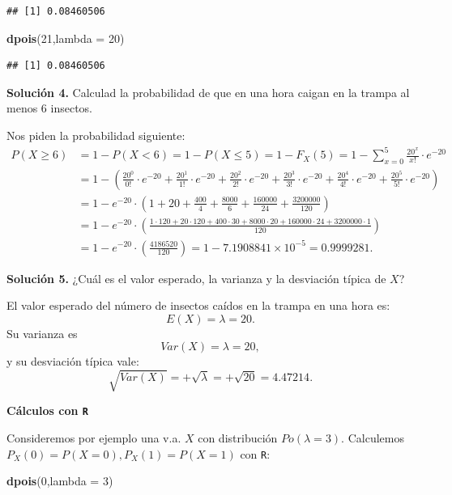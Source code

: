 \documentclass[]{book}
\newenvironment{Shaded}{\begin{snugshade}}{\end{snugshade}}
\newcommand{\DataTypeTok}[1]{\textcolor[rgb]{0.13,0.29,0.53}{#1}}
\newcommand{\DecValTok}[1]{\textcolor[rgb]{0.00,0.00,0.81}{#1}}
\newcommand{\KeywordTok}[1]{\textcolor[rgb]{0.13,0.29,0.53}{\textbf{#1}}}
\newcommand{\NormalTok}[1]{#1}
\begin{document}
\begin{verbatim}
## [1] 0.08460506
\end{verbatim}

\begin{Shaded}
\begin{Highlighting}[]
\KeywordTok{dpois}\NormalTok{(}\DecValTok{21}\NormalTok{,}\DataTypeTok{lambda =} \DecValTok{20}\NormalTok{)}
\end{Highlighting}
\end{Shaded}

\begin{verbatim}
## [1] 0.08460506
\end{verbatim}

\textbf{Solución 4.} Calculad la probabilidad de que en una hora caigan en la trampa al menos 6 insectos.

Nos piden la probabilidad siguiente:
\[
\begin{array}{rl}
 P(X\geq 6)&=1- P(X<6)=1-P(X\leq 5)=1-F_X(5)=1-\displaystyle\sum_{x=0}^{5} \frac{20^{x}}{x!}\cdot e^{-20}\\
 &=
 1-\left(\frac{20^{0}}{0!}\cdot e^{-20}+\frac{20^{1}}{1!}\cdot e^{-20}+\frac{20^{2}}{2!}\cdot e^{-20}+\frac{20^{3}}{3!}\cdot e^{-20}+\frac{20^{4}}{4!}\cdot e^{-20}+\frac{20^{5}}{5!}\cdot e^{-20}\right)\\
 &=
 1-e^{-20}\cdot \left(1+20+\frac{400}{4}+\frac{8000}{6}+\frac{160000}{24}+\frac{3200000}{120}\right)\\
 &=
 1-e^{-20} \cdot \left(\frac{1 \cdot 120+20\cdot 120+400\cdot 30+8000\cdot 20+160000\cdot 24+3200000\cdot 1}{120}\right)\\
 &= 1-e^{-20}\cdot\left(\frac{4186520}{120}\right)=1-\ensuremath{7.1908841\times 10^{-5}} =0.9999281.
\end{array}
\]

\textbf{Solución 5.} ¿Cuál es el valor esperado, la varianza y la desviación típica de \(X\)?

El valor esperado del número de insectos caídos en la trampa en una hora es:
\[E(X)=\lambda=20.\]
Su varianza es
\[Var(X)=\lambda=20,\]
y su desviación típica vale:
\[\sqrt{Var(X)}=+\sqrt{\lambda}=+\sqrt{20}=4.47214.\]

\textbf{Cálculos con \texttt{R}}

Consideremos por ejemplo una v.a. \(X\) con distribución \(Po(\lambda=3)\). Calculemos \(P_X(0)=P(X=0), P_X(1)=P(X=1)\) con \texttt{R}:

\begin{Shaded}
\begin{Highlighting}[]
\KeywordTok{dpois}\NormalTok{(}\DecValTok{0}\NormalTok{,}\DataTypeTok{lambda =} \DecValTok{3}\NormalTok{)}
\end{Highlighting}
\end{Shaded}
\end{document}
